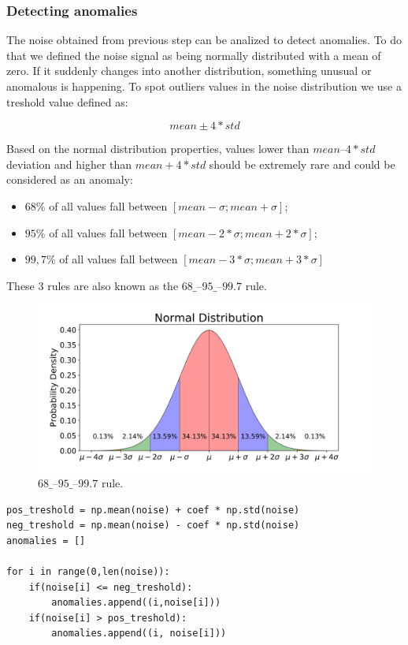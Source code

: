 \documentclass[12pt]{article}
\begin{document}
		\subsubsection{Detecting anomalies}
			The noise obtained from previous step can be analized to detect anomalies. To do that we defined the noise signal as being normally distributed with a mean of zero. If it suddenly changes into another distribution, something unusual or anomalous is happening. To spot outliers values in the noise distribution we use a treshold value defined as:
			
			$$ mean \pm 4*std $$
			
			Based on the normal distribution properties, values lower than $mean – 4 * std$ deviation and higher than $mean + 4 * std$ should be extremely rare and could be considered as an anomaly: 
			\begin{itemize}
				\item $68\%$ of all values fall between $[mean-\sigma; mean+\sigma]$;
				\item $95\%$ of all values fall between $[mean-2*\sigma; mean+2*\sigma]$; 
				\item $99,7\%$ of all values fall between $[mean-3*\sigma; mean+3*\sigma]$ 
			\end{itemize}
		
			These 3 rules are also known as the $68 \_–95 \_–99.7$ rule.
			
			\begin{figure}[h!]
				\centering
				\includegraphics[scale=0.1]{img/rule.png}
				\caption{$68 \_–95 \_–99.7$ rule.}
			\end{figure}
			
			\begin{lstlisting}
pos_treshold = np.mean(noise) + coef * np.std(noise)
neg_treshold = np.mean(noise) - coef * np.std(noise)
anomalies = []

for i in range(0,len(noise)):
	if(noise[i] <= neg_treshold):
		anomalies.append((i,noise[i]))
	if(noise[i] > pos_treshold):
		anomalies.append((i, noise[i]))
			\end{lstlisting}
			
\end{document}
